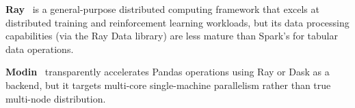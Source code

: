 \textbf{Ray}~\cite{moritz2018ray} is a general-purpose distributed computing
framework that excels at distributed training and reinforcement learning
workloads, but its data processing capabilities (via the Ray Data library) are
less mature than Spark's for tabular data operations.

\textbf{Modin}~\cite{petersohn2020towards} transparently accelerates Pandas
operations using Ray or Dask as a backend, but it targets multi-core
single-machine parallelism rather than true multi-node distribution.




